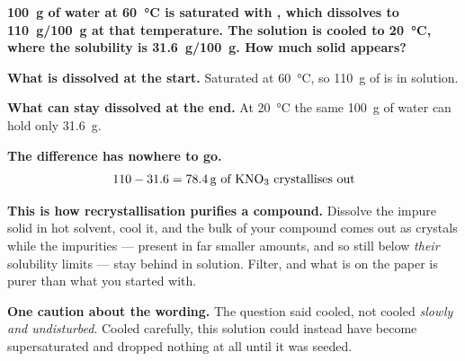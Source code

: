 \documentclass{apchem-worksheet}
\begin{document}
\begin{workedexample}
\textbf{\SI{100}{\gram} of water at \SI{60}{\celsius} is saturated with
, which dissolves to \SI{110}{\gram}/\SI{100}{\gram} at that
temperature. The solution is cooled to \SI{20}{\celsius}, where the
solubility is \SI{31.6}{\gram}/\SI{100}{\gram}. How much solid appears?}

\textbf{What is dissolved at the start.} Saturated at
\SI{60}{\celsius}, so \SI{110}{\gram} of  is in solution.

\textbf{What can stay dissolved at the end.} At \SI{20}{\celsius} the
same \SI{100}{\gram} of water can hold only \SI{31.6}{\gram}.

\textbf{The difference has nowhere to go.}
\[ 110 - 31.6 = \mathbf{\SI{78.4}{\gram}}\text{ of \ce{KNO3}
   crystallises out} \]

\textbf{This is how recrystallisation purifies a compound.} Dissolve
the impure solid in hot solvent, cool it, and the bulk of your compound
comes out as crystals while the impurities --- present in far smaller
amounts, and so still below \emph{their} solubility limits --- stay
behind in solution. Filter, and what is on the paper is purer than what
you started with.

\textbf{One caution about the wording.} The question said cooled, not
cooled \emph{slowly and undisturbed}. Cooled carefully, this solution
could instead have become supersaturated and dropped nothing at all
until it was seeded.
\end{workedexample}
\end{document}
